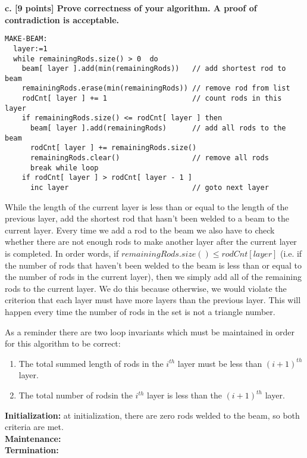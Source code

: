 \documentclass[12pt]{article}
\begin{document}
\noindent \textbf{c. [9 points] Prove correctness of your algorithm. A proof of contradiction is acceptable.}
\begin{lstlisting}[frame=single]
MAKE-BEAM:
  layer:=1                                                        
  while remainingRods.size() > 0  do 
    beam[ layer ].add(min(remainingRods))   // add shortest rod to beam
    remainingRods.erase(min(remainingRods)) // remove rod from list
    rodCnt[ layer ] += 1                    // count rods in this layer
    if remainingRods.size() <= rodCnt[ layer ] then
      beam[ layer ].add(remainingRods)      // add all rods to the beam
      rodCnt[ layer ] += remainingRods.size()
      remainingRods.clear()                 // remove all rods 
      break while loop
    if rodCnt[ layer ] > rodCnt[ layer - 1 ]
      inc layer                             // goto next layer
\end{lstlisting}

While the length of the current layer is less than or equal to the 
length of the previous layer, add the shortest rod that hasn't 
been welded to a beam to the current layer. 
Every time we add a rod to the beam we also have to check whether there 
are not enough rods to make another layer after the current layer is completed. 
In order words, if $ remainingRods.size() \le rodCnt[ layer ] $
(i.e. if the number of rods that haven't been welded to the beam is less than 
or equal to the number of rods in the current layer), 
then we simply add all of the 
remaining rods to the current layer. We do this because otherwise, we would 
violate the criterion that each layer must have more layers than the 
previous layer. 
This will happen every time the number of rods in the set is not a triangle 
number.

\noindent As a reminder there are two loop invariants which must be maintained in order for this 
algorithm to be correct: 
\begin{enumerate}
  \item The total summed length of rods in the $i^{th}$ layer must be less than $(i +1)^{th} $layer.
  \item The total number of rodsin the $i^{th}$ layer is less than the $(i +1)^{th}$ layer.
\end{enumerate}


\textbf{Initialization:} at initialization, there are zero rods welded to the beam, so both criteria are met. \\
\textbf{Maintenance:} 
\\
\textbf{Termination:} \\
\end{document}

